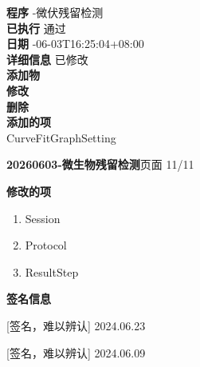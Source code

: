\documentclass[UTF8,10pt,a4paper,fontset=fandol]{ctexart}
\newcommand{\handwritten}[1]{#1}
\begin{document}
\begin{flushleft}
\textbf{程序} -微伏残留检测\\
\textbf{已执行} \quad 通过\\
\textbf{日期} -06-03T16:25:04+08:00\\
\textbf{详细信息} \quad 已修改\\[2pt]
\textbf{添加物} \\
\textbf{修改} \\
\textbf{删除} \\[2pt]
\textbf{添加的项}\\
\quad CurveFitGraphSetting
\end{flushleft}


\newpage

\noindent\textbf{20260603-微生物残留检测}\hfill 页面 11/11

\vspace{1em}

\noindent\textbf{修改的项}

\begin{enumerate}
    \item Session
    \item Protocol
    \item ResultStep
\end{enumerate}

\noindent\textbf{签名信息}

\vspace{17cm}

\noindent
\handwritten{[签名，难以辨认]}
\hfill
\handwritten{2024.06.23}

\vspace{0.5em}

\noindent
\handwritten{[签名，难以辨认]}
\hfill
\handwritten{2024.06.09}
\end{document}
